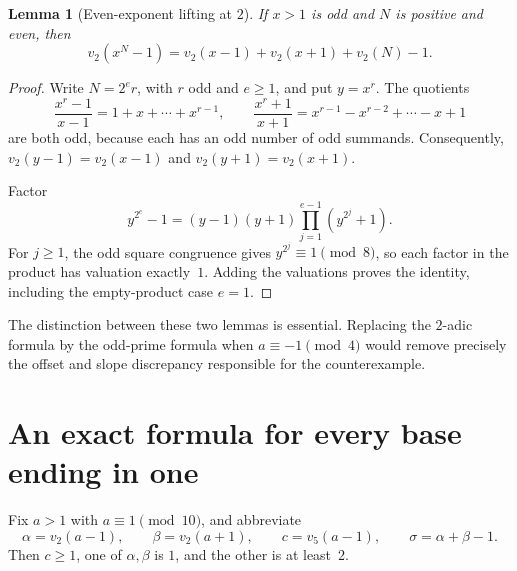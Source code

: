 \documentclass[11pt,a4paper]{article}
\newtheorem{lemma}[theorem]{Lemma}
\theoremstyle{definition}
\theoremstyle{remark}
\begin{document}
\begin{lemma}[Even-exponent lifting at $2$]\label{lem:twoLTE}
If $x>1$ is odd and $N$ is positive and even, then
\[
 v_2(x^N-1)=v_2(x-1)+v_2(x+1)+v_2(N)-1.
\]
\end{lemma}
\begin{proof}
Write $N=2^e r$, with $r$ odd and $e\ge1$, and put $y=x^r$. The quotients
\[
 \frac{x^r-1}{x-1}=1+x+\cdots+x^{r-1},\qquad
 \frac{x^r+1}{x+1}=x^{r-1}-x^{r-2}+\cdots-x+1
\]
are both odd, because each has an odd number of odd summands. Consequently,
$v_2(y-1)=v_2(x-1)$ and $v_2(y+1)=v_2(x+1)$.

Factor
\[
 y^{2^e}-1=(y-1)(y+1)\prod_{j=1}^{e-1}(y^{2^j}+1).
\]
For $j\ge1$, the odd square congruence gives $y^{2^j}\equiv1\pmod8$, so each factor in the product has valuation exactly~$1$. Adding the valuations proves the identity, including the empty-product case $e=1$.
\end{proof}

The distinction between these two lemmas is essential. Replacing the $2$-adic formula by the odd-prime formula when $a\equiv-1\pmod4$ would remove precisely the offset and slope discrepancy responsible for the counterexample.

\section{An exact formula for every base ending in one}
\label{sec:affine}

Fix $a>1$ with $a\equiv1\pmod{10}$, and abbreviate
\begin{equation}\label{eq:parameters}
 \alpha=v_2(a-1),\qquad \beta=v_2(a+1),\qquad
 c=v_5(a-1),\qquad \sigma=\alpha+\beta-1.
\end{equation}
Then $c\ge1$, one of $\alpha,\beta$ is $1$, and the other is at least~$2$.
\end{document}
